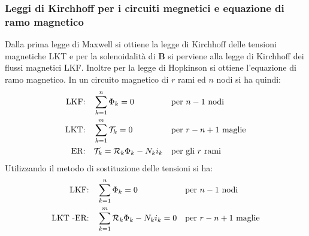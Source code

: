 \documentclass{article}
\begin{document}
\subsubsection{Leggi di Kirchhoff per i circuiti megnetici e equazione di ramo magnetico}
Dalla prima legge di Maxwell si ottiene la legge di Kirchhoff delle tensioni magnetiche LKT e per la solenoidalità di $\mathbf{B}$ si perviene alla legge di Kirchhoff dei flussi magnetici LKF. Inoltre per la legge di Hopkinson si ottiene l'equazione di ramo magnetico. In un circuito magnetico di $r$ rami ed $n$ nodi si ha quindi:
\begin{align*}
    \text{LKF:}& 
    &
    &\sum_{k=1}^n \Phi_k = 0
    &
    &\text{per } n-1 \text{ nodi}
    \\
    \text{LKT:}& 
    &
    &\sum_{k=1}^m \mathcal{T}_k = 0
    &
    &\text{per } r-n+1 \text{ maglie}
    \\
    \text{ER:}& 
    &
    &\mathcal{T}_k = \mathcal{R}_k \Phi_k - N_ki_k
    &
    &\text{per gli } r \text{ rami}
\end{align*}
Utilizzando il metodo di sostituzione delle tensioni si ha:
\begin{align*}
    \text{LKF:}& 
    &
    &\sum_{k=1}^n \Phi_k = 0
    &
    &\text{per } n-1 \text{ nodi}
    \\
    \text{LKT -ER:}& 
    &
    &\sum_{k=1}^m  \mathcal{R}_k \Phi_k - N_ki_k = 0
    &
    &\text{per } r-n+1 \text{ maglie}
\end{align*}
\end{document}
